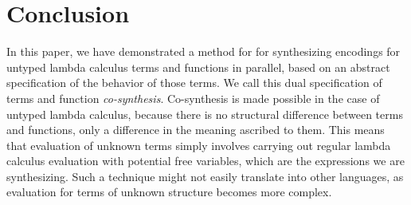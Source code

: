 \section{Conclusion}
In this paper, we have demonstrated a method for for synthesizing encodings
  for untyped lambda calculus terms and functions in parallel, based on an
  abstract specification of the behavior of those terms.
We call this dual specification of terms and function \textit{co-synthesis}.
Co-synthesis is made possible in the case of untyped lambda
  calculus, because there is no structural difference between terms and
  functions, only a difference in the meaning ascribed to them.
This means that evaluation of unknown terms simply involves carrying out
  regular lambda calculus evaluation with potential free variables, which
  are the expressions we are synthesizing.
Such a technique might not easily translate into other languages, as
  evaluation for terms of unknown structure becomes more complex.
